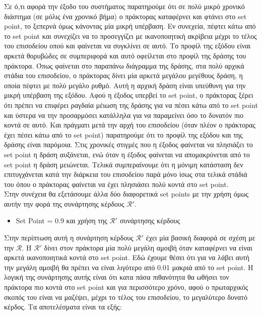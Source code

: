 \documentclass[11pt]{article} %
\numberwithin{equation}{subsection}
\begin{document}
Σε ό,τι αφορά την έξοδο του συστήματος παρατηρούμε ότι σε πολύ μικρό χρονικό διάστημα (σε μόλις ένα χρονικό βήμα) ο πράκτορας καταφέρνει και φτάνει στο set point, το ξεπερνά όμως κάνοντας μία μικρή υπέρβαση. Εν συνεχεία, πέφτει κάτω από το set point και συνεχίζει να το προσεγγίζει με ικανοποιητική ακρίβεια μέχρι το τέλος του επισοδείου οπού και φαίνεται να συγκλίνει σε αυτό. Το προφίλ της εξόδου είναι αρκετά θορυβώδες σε συμπεριφορά και αυτό οφείλεται στο προφίλ της δράσης του πράκτορα. Όπως φαίνεται στο παραπάνω διάγραμμα της δράσης, στα πολύ αρχικά στάδια του επισοδείου, ο πράκτορας δίνει μία αρκετά μεγάλου μεγέθους δράση, η οποία πέφτει με πολύ μεγάλο ρυθμό. Αυτή η αρχική δράση είναι υπεύθυνη για την μικρή υπέρβαση της εξόδου. Αφού η έξοδος υπερβεί το set point, ο πράκτορας ξέρει ότι πρέπει να επιφέρει ραγδαία μέιωση της δράσης για να πέσει κάτω από το set point και ύστερα να την προσαρμόσει κατάλληλα για να παραμείνει όσο το δυνατόν πιο κοντά σε αυτό. Και πράγματι μετά την αρχή του επισοδείου (όταν πλέον ο πράκτορας έχει πέσει κάτω από το set point) παρατηρούμε ότι το προφίλ της εξόδου και της δράσης είναι παρόμοια. Στις χρονικές στιγμές που η έξοδος φαίνεται να πλησιάζει το set point η δράση αυξάνεται, ενώ όταν η έξοδος φαίνεται να απομακρύνεται από το set point η δράση μειώνεται. Τελικά συμπεραίνουμε ότι η μόνιμη κατάσταση δεν επιτυγχάνεται κατά την διάρκεια του επισοδείου παρά μόνο ίσως στα τελικά στάδιά του όπου ο πράκτορας φαίνεται να έχει πλησιάσει πολύ κοντά στο set point.\\

Στην συνέχεια θα εξετάσουμε άλλα δύο διαφορετικά set points με την χρήση όμως αυτήν την φορά της συνάρτησης κέρδους $\mathcal{R}'$.

\begin{itemize}
\item Set Point = 0.9 και χρήση της $\mathcal{R}'$ συνάρτησης κέρδους
\end{itemize}
Στην περίπτωση αυτή η συνάρτηση κέρδους $\mathcal{R}'$ έχει μία βασική διαφορά σε σχέση με την $\mathcal{R}$. Η $\mathcal{R}'$ δίνει στον πράκτορα μία πολύ μεγάλη αμοιβή όταν καταφέρνει να είναι αρκετά ικανοποιητικά κοντά στο set point. Εδώ έχουμε θέσει ότι για να λάβει αυτή την μεγάλη αμοιβή θα πρέπει να είναι λιγότερο από 0.01 μακριά από το set point. Η λογική της συνάρτησης αυτής είναι ότι κατα πάσα πιθανότητα θα ωθήσει τον πράκτορα πιο κοντά στο set point και για περισσότερο χρόνο, αφού ο πρωταρχικός σκοπός του είναι να μαζέψει, μέχρι το τέλος του επισοδείου, το μεγαλύτερο δυνατό κέρδος. Τα αποτελέσματα είναι τα εξής:
\end{document}

